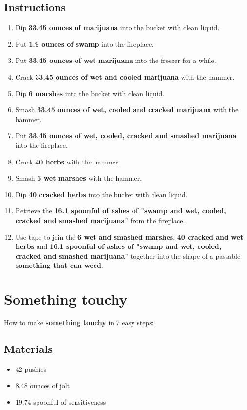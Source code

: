 \documentclass{article}
\begin{document}
\subsection{Instructions}\begin{enumerate}
\item 
Dip \textbf{33.45 ounces of marijuana} into the bucket with clean liquid.
\item 
Put \textbf{1.9 ounces of swamp} into the fireplace.
\item 
Put \textbf{33.45 ounces of wet marijuana} into the freezer for a while.
\item 
Crack \textbf{33.45 ounces of wet and cooled marijuana} with the hammer.
\item 
Dip \textbf{6 marshes} into the bucket with clean liquid.
\item 
Smash \textbf{33.45 ounces of wet, cooled and cracked marijuana} with the hammer.
\item 
Put \textbf{33.45 ounces of wet, cooled, cracked and smashed marijuana} into the fireplace.
\item 
Crack \textbf{40 herbs} with the hammer.
\item 
Smash \textbf{6 wet marshes} with the hammer.
\item 
Dip \textbf{40 cracked herbs} into the bucket with clean liquid.
\item 
Retrieve the \textbf{16.1 spoonful of ashes of "swamp and wet, cooled, cracked and smashed marijuana"} from the fireplace.
\item 
Use tape to join the \textbf{6 wet and smashed marshes}, \textbf{40 cracked and wet herbs} and \textbf{16.1 spoonful of ashes of "swamp and wet, cooled, cracked and smashed marijuana"} together into the shape of a passable \textbf{something that can weed}.
\end{enumerate}
\newpage
\section{Something touchy}How to make \textbf{something touchy} in 7 easy steps:

\subsection{Materials}\begin{itemize}
\item 
42 pushies
\item 
8.48 ounces of jolt
\item 
19.74 spoonful of sensitiveness
\end{itemize}
\end{document}
